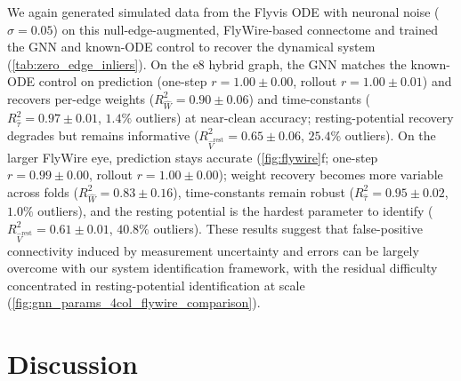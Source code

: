 \documentclass{article}
\begin{document}
We again generated simulated data from the Flyvis ODE with neuronal noise ($\sigma=0.05$) on this null-edge-augmented, FlyWire-based connectome and trained the GNN and known-ODE control to recover the dynamical system (\cref{tab:zero_edge_inliers}). On the e8 hybrid graph, the GNN matches the known-ODE control on prediction (one-step $r = 1.00 \pm 0.00$, rollout $r = 1.00 \pm 0.01$) and recovers per-edge weights ($R^2_{\hat{W}} = 0.90 \pm 0.06$) and time-constants ($R^2_{\hat{\tau}} = 0.97 \pm 0.01$, $1.4\%$ outliers) at near-clean accuracy; resting-potential recovery degrades but remains informative ($R^2_{\hat{V}^{\mathrm{rest}}} = 0.65 \pm 0.06$, $25.4\%$ outliers). On the larger FlyWire eye, prediction stays accurate (\cref{fig:flywire}f; one-step $r = 0.99 \pm 0.00$, rollout $r = 1.00 \pm 0.00$); weight recovery becomes more variable across folds ($R^2_{\hat{W}} = 0.83 \pm 0.16$), time-constants remain robust ($R^2_{\hat{\tau}} = 0.95 \pm 0.02$, $1.0\%$ outliers), and the resting potential is the hardest parameter to identify ($R^2_{\hat{V}^{\mathrm{rest}}} = 0.61 \pm 0.01$, $40.8\%$ outliers). These results suggest that false-positive connectivity induced by measurement uncertainty and errors can be largely overcome with our system identification framework, with the residual difficulty concentrated in resting-potential identification at scale (\cref{fig:gnn_params_4col_flywire_comparison}).

% 
% 




\section{Discussion}
\end{document}
